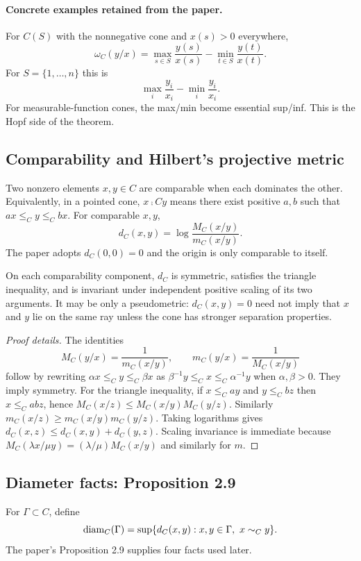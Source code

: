 \paragraph{Concrete examples retained from the paper.}
For $C(S)$ with the nonnegative cone and $x(s)>0$ everywhere,
\[
  \omega_C(y/x)=\max_{s\in S}\frac{y(s)}{x(s)}-\min_{t\in S}\frac{y(t)}{x(t)}.
\]
For $S=\{1,\ldots,n\}$ this is
\[
  \max_i \frac{y_i}{x_i}-\min_i\frac{y_i}{x_i}.
\]
For measurable-function cones, the max/min become essential sup/inf.
This is the Hopf side of the theorem.

\subsection{Comparability and Hilbert's projective metric}
Two nonzero elements $x,y\in C$ are comparable when each dominates the other.
Equivalently, in a pointed cone, $x\comp C y$ means there exist positive $a,b$ such that
$a x\le_C y\le_C b x$.
For comparable $x,y$,
\[
  d_C(x,y)=\log\frac{M_C(x/y)}{m_C(x/y)}.
\]
The paper adopts $d_C(0,0)=0$ and the origin is only comparable to itself.

\begin{lemma}
On each comparability component, $d_C$ is symmetric, satisfies the triangle inequality, and is invariant under independent positive scaling of its two arguments.
It may be only a pseudometric: $d_C(x,y)=0$ need not imply that $x$ and $y$ lie on the same ray unless the cone has stronger separation properties.
\end{lemma}

\begin{proof}[Proof details]
The identities
\[
  M_C(y/x)=\frac{1}{m_C(x/y)},\qquad
  m_C(y/x)=\frac{1}{M_C(x/y)}
\]
follow by rewriting $\alpha x\le_C y\le_C\beta x$ as
$\beta^{-1}y\le_C x\le_C\alpha^{-1}y$ when $\alpha,\beta>0$.
They imply symmetry.
For the triangle inequality, if $x\le_C a y$ and $y\le_C b z$ then $x\le_C ab z$, hence
$M_C(x/z)\le M_C(x/y)M_C(y/z)$.
Similarly $m_C(x/z)\ge m_C(x/y)m_C(y/z)$.
Taking logarithms gives
$d_C(x,z)\le d_C(x,y)+d_C(y,z)$.
Scaling invariance is immediate because $M_C(\lambda x/\mu y)=(\lambda/\mu)M_C(x/y)$ and similarly for $m$.
\end{proof}

\subsection{Diameter facts: Proposition 2.9}
For $\Gamma\subset C$, define
\[
  \diam_C(\Gamma)=\sup\{d_C(x,y):x,y\in\Gamma,\ x\comp C y\}.
\]
The paper's Proposition 2.9 supplies four facts used later.

